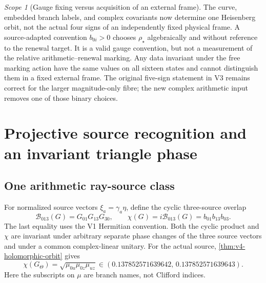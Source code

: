 \documentclass[11pt]{article}
\theoremstyle{definition}
\theoremstyle{remark}
\newtheorem{scope}[scope]{Scope}
\begin{document}
\begin{scope}[Gauge fixing versus acquisition of an external frame]
The curve, embedded branch labels, and complex covariants now determine one
Heisenberg orbit, not the actual four signs of an independently fixed
physical frame. A source-adapted convention $b_{0i}>0$ chooses
$\rho_\star$ algebraically and without reference to the renewal target.
It is a valid gauge convention, but not a measurement of the relative
arithmetic--renewal marking. Any data invariant under the free marking
action have the same values on all sixteen states and cannot distinguish
them in a fixed external frame. The original five-sign statement in V3
remains correct for the larger magnitude-only fibre; the new complex
arithmetic input removes one of those binary choices.
\end{scope}

\section{Projective source recognition and an invariant triangle phase}
\label{sec:v4-projective-recognition}

\subsection{One arithmetic ray-source class}
For normalized source vectors $\xi_a=\gamma_a\eta$, define the cyclic
three-source overlap
\begin{equation}
 \mathcal B_{013}(G)=G_{01}G_{13}G_{30},\qquad
 \chi(G)=i\mathcal B_{013}(G)=b_{01}b_{13}b_{03}.
 \label{eq:v4-triangle}
\end{equation}
The last equality uses the V1 Hermitian convention. Both the cyclic
product and $\chi$ are invariant under arbitrary separate phase changes
of the three source vectors and under a common complex-linear unitary.
For the actual source, \cref{thm:v4-holomorphic-orbit} gives
\begin{equation}
 \boxed{\chi(G_\Theta)
   =\sqrt{\mu_{0u}\mu_{0z}\mu_{uz}}
   \in(0.137852571639642,\,0.137852571639643).}
 \label{eq:v4-actual-triangle}
\end{equation}
Here the subscripts on $\mu$ are branch names, not Clifford indices.
\end{document}
